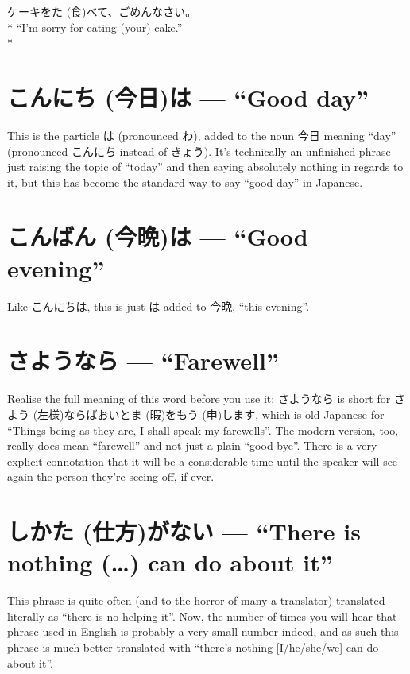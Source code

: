 \documentclass[11pt, b5paper, twoside, openright, onecolumn]{book}
\makeatletter
\newcommand*{\rubystack}[2]{{\relscale{0.5}%
  \begin{tabular}[b]{@{}c@{}}%
    {#1}\\%
   {\textscale{2}{#2}}%
  \end{tabular}}%
}
\DeclareRobustCommand*{\ruby}[2]{%
  \mbox{%
    \setlength{\parskip}{0ex}%
    \BeginAccSupp{method=pdfstringdef,ActualText={#1}}%
      \rubystack{\phantom{#2}}{#1}%
      \llap{%
        \rubystack{#2}{\phantom{#1}}%
      }%
    \EndAccSupp{}%
  }%
}
\renewcommand*{\ruby}[2]{#2 (#1)}%
\newenvironment{exampleblock}{
\setlength{\parindent}{0.6in}
\begin{minipage}[t]{\dimexpr\textwidth-\parindent}}
{\end{minipage}}
\makeatother
\begin{document}
\vspace{0.4cm}
\begin{exampleblock}
ケーキを\ruby{食}{た}べて、ごめんなさい。 \\* 
“I’m sorry for eating (your) cake.” \\* 
\end{exampleblock}
\section*{\ruby{今日}{こんにち}は — “Good day”}


This is the particle は (pronounced わ)‚ added to the noun 今日 meaning “day” (pronounced こんにち instead of きょう). It’s technically an unfinished phrase just raising the topic of “today” and then saying absolutely nothing in regards to it‚ but this has become the standard way to say “good day” in Japanese.

\section*{\ruby{今晩}{こんばん}は — “Good evening”}

Like こんにちは‚ this is just は added to 今晩‚ “this evening”.

\section*{さようなら — “Farewell”}

Realise the full meaning of this word before you use it: さようなら is short for \ruby{左様}{さよう}ならばお\ruby{暇}{いとま}を\ruby{申}{もう}します‚ which is old Japanese for “Things being as they are‚ I shall speak my farewells”. The modern version‚ too‚ really does mean “farewell” and not just a plain “good bye”. There is a very explicit connotation that it will be a considerable time until the speaker will see again the person they’re seeing off‚ if ever.

\section*{\ruby{仕方}{しかた}がない — “There is nothing (…) can do about it”}

This phrase is quite often (and to the horror of many a translator) translated literally as “there is no helping it”. Now‚ the number of times you will hear that phrase used in English is probably a very small number indeed‚ and as such this phrase is much better translated with “there’s nothing [I/he/she/we] can do about it”.
\end{document}
